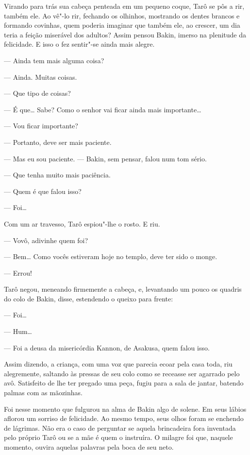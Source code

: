 Virando para trás sua cabeça penteada em um pequeno coque, Tarô se pôs a
rir, também ele. Ao vê"-lo rir, fechando os olhinhos, mostrando os
dentes brancos e formando covinhas, quem poderia imaginar que também
ele, ao crescer, um dia teria a feição miserável dos adultos? Assim
pensou Bakin, imerso na plenitude da felicidade. E isso o fez sentir"-se
ainda mais alegre.

--- Ainda tem mais alguma coisa?

--- Ainda. Muitas coisas.

--- Que tipo de coisas?

--- É que\ldots{} Sabe? Como o senhor vai ficar ainda mais importante\ldots{}

--- Vou ficar importante?

--- Portanto, deve ser mais paciente.

--- Mas eu sou paciente. --- Bakin, sem pensar, falou num tom sério.

--- Que tenha muito mais paciência.

--- Quem é que falou isso?

--- Foi\ldots{}

Com um ar travesso, Tarô espiou"-lhe o rosto. E riu.

--- Vovô, adivinhe quem foi?

--- Bem\ldots{} Como vocês estiveram hoje no templo, deve ter sido o monge.

--- Errou!

Tarô negou, meneando firmemente a cabeça, e, levantando um pouco os
quadris do colo de Bakin, disse, estendendo o queixo para frente:

--- Foi\ldots{}

--- Hum\ldots{}

--- Foi a deusa da misericórdia Kannon, de Asakusa, quem falou isso.

Assim dizendo, a criança, com uma voz que parecia ecoar pela casa toda,
riu alegremente, saltando às pressas de seu colo como se receasse ser
agarrado pelo avô. Satisfeito de lhe ter pregado uma peça, fugiu para a
sala de jantar, batendo palmas com as mãozinhas.

Foi nesse momento que fulgurou na alma de Bakin algo de solene. Em seus
lábios aflorou um sorriso de felicidade. Ao mesmo tempo, seus olhos
foram se enchendo de lágrimas. Não era o caso de perguntar se aquela
brincadeira fora inventada pelo próprio Tarô ou se a mãe é quem o
instruíra. O milagre foi que, naquele momento, ouvira aquelas palavras
pela boca de seu neto.

